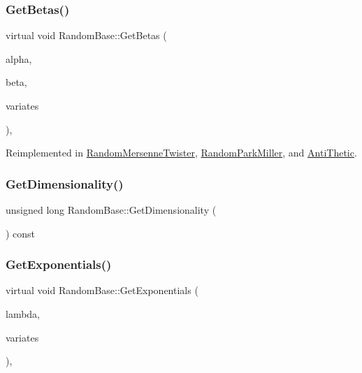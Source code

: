 \subsubsection{\texorpdfstring{Get\+Betas()}{GetBetas()}}
{\footnotesize\ttfamily virtual void Random\+Base\+::\+Get\+Betas (\begin{DoxyParamCaption}\item[{double}]{alpha,  }\item[{double}]{beta,  }\item[{\hyperlink{classMJArray}{M\+J\+Array} \&}]{variates }\end{DoxyParamCaption})\hspace{0.3cm}{\ttfamily [inline]}, {\ttfamily [virtual]}}



Reimplemented in \hyperlink{classRandomMersenneTwister_aac61b45bc4e003cad863d39e8333a434}{Random\+Mersenne\+Twister}, \hyperlink{classRandomParkMiller_a100f104e3e067070906db8847be9b5d7}{Random\+Park\+Miller}, and \hyperlink{classAntiThetic_a84fc41c2b4e5a1de78f3399e21c067f8}{Anti\+Thetic}.

\hypertarget{classRandomBase_a457727d36711c20cb23d187e59869885}{}\label{classRandomBase_a457727d36711c20cb23d187e59869885} 
\subsubsection{\texorpdfstring{Get\+Dimensionality()}{GetDimensionality()}}
{\footnotesize\ttfamily unsigned long Random\+Base\+::\+Get\+Dimensionality (\begin{DoxyParamCaption}{ }\end{DoxyParamCaption}) const\hspace{0.3cm}{\ttfamily [inline]}}

\hypertarget{classRandomBase_ad1d2c39a8440f67cffda3ad41a4f9975}{}\label{classRandomBase_ad1d2c39a8440f67cffda3ad41a4f9975} 
\subsubsection{\texorpdfstring{Get\+Exponentials()}{GetExponentials()}}
{\footnotesize\ttfamily virtual void Random\+Base\+::\+Get\+Exponentials (\begin{DoxyParamCaption}\item[{double}]{lambda,  }\item[{\hyperlink{classMJArray}{M\+J\+Array} \&}]{variates }\end{DoxyParamCaption})\hspace{0.3cm}{\ttfamily [inline]}, {\ttfamily [virtual]}}



